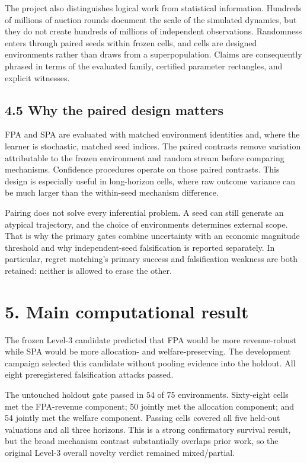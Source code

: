 \documentclass[11pt]{article}
\begin{document}
The project also distinguishes logical work from statistical information. Hundreds of millions of auction rounds document the scale of the simulated dynamics, but they do not create hundreds of millions of independent observations. Randomness enters through paired seeds within frozen cells, and cells are designed environments rather than draws from a superpopulation. Claims are consequently phrased in terms of the evaluated family, certified parameter rectangles, and explicit witnesses.

\subsection{4.5 Why the paired design matters}
FPA and SPA are evaluated with matched environment identities and, where the learner is stochastic, matched seed indices. The paired contrasts remove variation attributable to the frozen environment and random stream before comparing mechanisms. Confidence procedures operate on those paired contrasts. This design is especially useful in long-horizon cells, where raw outcome variance can be much larger than the within-seed mechanism difference.

Pairing does not solve every inferential problem. A seed can still generate an atypical trajectory, and the choice of environments determines external scope. That is why the primary gates combine uncertainty with an economic magnitude threshold and why independent-seed falsification is reported separately. In particular, regret matching's primary success and falsification weakness are both retained: neither is allowed to erase the other.

\section{5. Main computational result}
The frozen Level-3 candidate predicted that FPA would be more revenue-robust while SPA would be more allocation- and welfare-preserving. The development campaign selected this candidate without pooling evidence into the holdout. All eight preregistered falsification attacks passed.

The untouched holdout gate passed in 54 of 75 environments. Sixty-eight cells met the FPA-revenue component; 50 jointly met the allocation component; and 54 jointly met the welfare component. Passing cells covered all five held-out valuations and all three horizons. This is a strong confirmatory survival result, but the broad mechanism contrast substantially overlaps prior work, so the original Level-3 overall novelty verdict remained mixed/partial.
\end{document}
